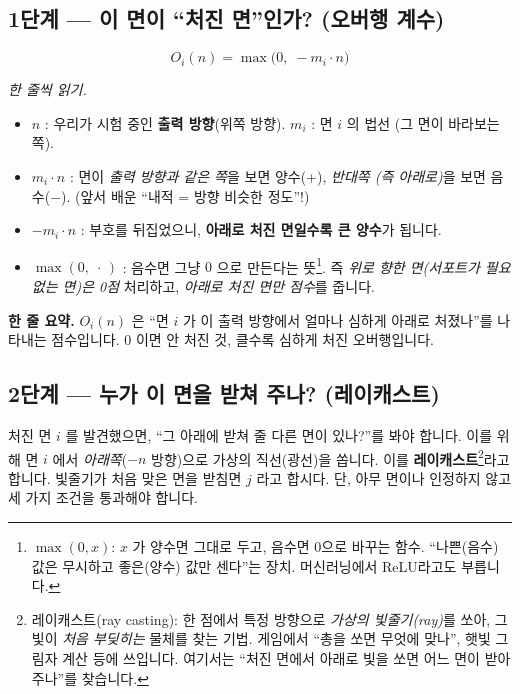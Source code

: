 \documentclass[11pt,a4paper]{article}
\begin{document}
\subsection{1단계 — 이 면이 ``처진 면''인가? (오버행 계수)}

\begin{equation}
O_i(n)=\max\!\big(0,\;-m_i\cdot n\big)
\label{eq:overhang}
\end{equation}

\noindent\textit{한 줄씩 읽기.}
\begin{itemize}[leftmargin=1.6em]
\item $n$ : 우리가 시험 중인 \textbf{출력 방향}(위쪽 방향). $m_i$ : 면 $i$ 의 법선
(그 면이 바라보는 쪽).
\item $m_i\cdot n$ : 면이 \emph{출력 방향과 같은 쪽}을 보면 양수(+), \emph{반대쪽
(즉 아래로)}을 보면 음수($-$). (앞서 배운 ``내적 = 방향 비슷한 정도''!)
\item $-m_i\cdot n$ : 부호를 뒤집었으니, \textbf{아래로 처진 면일수록 큰 양수}가
됩니다.
\item $\max(0,\;\cdot\,)$ : 음수면 그냥 $0$ 으로 만든다는 뜻\footnote{$\max(0,x)$:
$x$ 가 양수면 그대로 두고, 음수면 0으로 바꾸는 함수. ``나쁜(음수) 값은 무시하고
좋은(양수) 값만 센다''는 장치. 머신러닝에서 ReLU라고도 부릅니다.}. 즉 \emph{위로
향한 면(서포트가 필요 없는 면)은 0점} 처리하고, \emph{아래로 처진 면만 점수}를 줍니다.
\end{itemize}

\begin{readbox}
\textbf{한 줄 요약.} $O_i(n)$ 은 ``면 $i$ 가 이 출력 방향에서 얼마나 심하게
아래로 처졌나''를 나타내는 점수입니다. $0$ 이면 안 처진 것, 클수록 심하게 처진
오버행입니다.
\end{readbox}

\subsection{2단계 — 누가 이 면을 받쳐 주나? (레이캐스트)}

처진 면 $i$ 를 발견했으면, ``그 아래에 받쳐 줄 다른 면이 있나?''를 봐야 합니다.
이를 위해 면 $i$ 에서 \emph{아래쪽}($-n$ 방향)으로 가상의 직선(광선)을 쏩니다. 이를
\textbf{레이캐스트}\footnote{레이캐스트(ray casting): 한 점에서 특정 방향으로
\emph{가상의 빛줄기(ray)}를 쏘아, 그 빛이 \emph{처음 부딪히는} 물체를 찾는 기법.
게임에서 ``총을 쏘면 무엇에 맞나'', 햇빛 그림자 계산 등에 쓰입니다. 여기서는
``처진 면에서 아래로 빛을 쏘면 어느 면이 받아 주나''를 찾습니다.}라고 합니다.
빛줄기가 처음 맞은 면을 받침면 $j$ 라고 합시다. 단, 아무 면이나 인정하지 않고
세 가지 조건을 통과해야 합니다.
\end{document}

